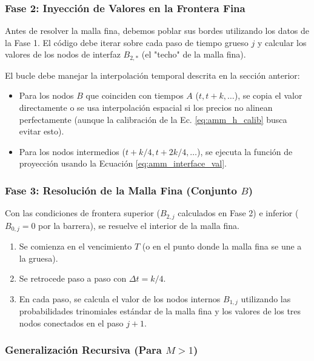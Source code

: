 \subsubsection{Fase 2: Inyección de Valores en la Frontera Fina} 

Antes de resolver la malla fina, debemos poblar sus bordes utilizando los datos de la Fase 1. El código debe iterar sobre cada paso de tiempo grueso $j$ y calcular los valores de los nodos de interfaz $B_{2,*}$ (el "techo" de la malla fina).

El bucle debe manejar la interpolación temporal descrita en la sección anterior: 
\begin{itemize} 
  \item Para los nodos $B$ que coinciden con tiempos $A$ ($t,t+k,\dots$), se copia el valor directamente o se usa interpolación espacial si los precios no alinean perfectamente (aunque la calibración de la Ec. \ref{eq:amm_h_calib} busca evitar esto). 
  
  \item Para los nodos intermedios ($t+k/4,t+2k/4,\dots$), se ejecuta la función de proyección usando la Ecuación \ref{eq:amm_interface_val}. 
\end{itemize}

\subsubsection{Fase 3: Resolución de la Malla Fina (Conjunto $B$)} 

Con las condiciones de frontera superior ($B_{2,j}$ calculados en Fase 2) e inferior ($B_{0,j}=0$ por la barrera), se resuelve el interior de la malla fina. 

\begin{enumerate} 
  \item Se comienza en el vencimiento $T$ (o en el punto donde la malla fina se une a la gruesa). 
  
  \item Se retrocede paso a paso con $\Delta t=k/4$. 
  
  \item En cada paso, se calcula el valor de los nodos internos $B_{1,j}$ utilizando las probabilidades trinomiales estándar de la malla fina y los valores de los tres nodos conectados en el paso $j+1$. 
\end{enumerate}

\subsubsection{Generalización Recursiva (Para $M>1$)} 

